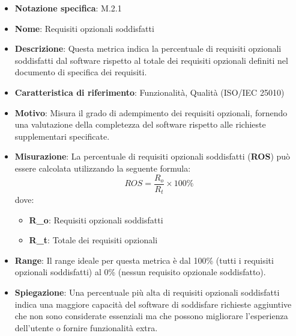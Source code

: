 \begin{itemize}
    \item \textbf{Notazione specifica}: M.2.1
    \item \textbf{Nome}: Requisiti opzionali soddisfatti
    \item \textbf{Descrizione}: Questa metrica indica la percentuale di requisiti opzionali soddisfatti dal software rispetto al totale dei requisiti opzionali definiti nel documento di specifica dei requisiti.
    \item \textbf{Caratteristica di riferimento}: Funzionalità, Qualità (ISO/IEC 25010)
    \item \textbf{Motivo}: Misura il grado di adempimento dei requisiti opzionali, fornendo una valutazione della completezza del software rispetto alle richieste supplementari specificate.
    \item \textbf{Misurazione}: La percentuale di requisiti opzionali soddisfatti (\textbf{ROS}) può essere calcolata utilizzando la seguente formula:
    \[ ROS = \frac{R_o}{R_t} \times 100\% \]
    dove:
    \begin{itemize}
        \item \textbf{R_o}: Requisiti opzionali soddisfatti
        \item \textbf{R_t}: Totale dei requisiti opzionali
    \end{itemize}
    \item \textbf{Range}: Il range ideale per questa metrica è dal 100\% (tutti i requisiti opzionali soddisfatti) al 0\% (nessun requisito opzionale soddisfatto).
    \item \textbf{Spiegazione}: Una percentuale più alta di requisiti opzionali soddisfatti indica una maggiore capacità del software di soddisfare richieste aggiuntive che non sono considerate essenziali ma che possono migliorare l'esperienza dell'utente o fornire funzionalità extra.
\end{itemize}
